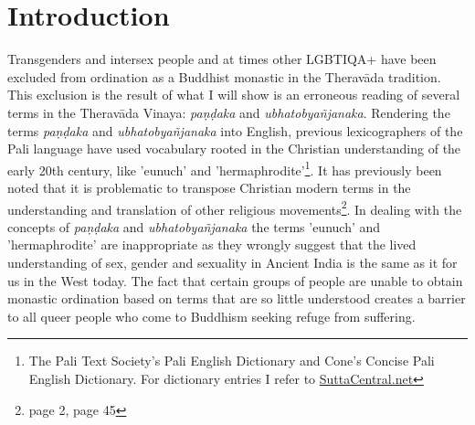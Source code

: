 \section{Introduction}
Transgenders and intersex people and at times other LGBTIQA+ have been excluded from ordination as a Buddhist monastic in the Theravāda tradition. This exclusion is the result of what I will show is an erroneous reading of several terms in the Theravāda Vinaya: {\em paṇḍaka} and {\em ubhatob­yañ­janaka}. Rendering the terms {\em paṇḍaka} and {\em ubhatob­yañ­janaka} into English, previous lexicographers of the Pali language have used vocabulary rooted in the Christian understanding of the early 20th century, like 'eunuch' and 'hermaphrodite'\footnote{The Pali Text Society's Pali English Dictionary and Cone's Concise Pali English Dictionary. For dictionary entries I refer to \href{https://suttacentral.net/}{SuttaCentral.net}}. It has previously been noted that it is problematic to transpose Christian modern terms in the understanding and translation of other religious movements\footnote{\cite{maes} page 2, \cite{dudas} page 45}. In dealing with the concepts of {\em paṇḍaka} and {\em ubhatob­yañ­janaka} the terms 'eunuch' and 'hermaphrodite' are inappropriate as they wrongly suggest that the lived understanding of sex, gender and sexuality in Ancient India is the same as it for us in the West today. The fact that certain groups of people are unable to obtain monastic ordination based on terms that are so little understood creates a barrier to all queer people who come to Buddhism seeking refuge from suffering.

